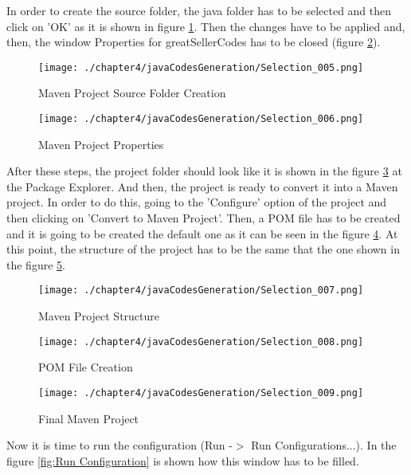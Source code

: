 In order to create the source folder, the java folder has to be selected and then click on 'OK' as it is shown in figure \ref{fig:Maven Project Source Folder Creation}. Then the changes have to be applied and, then, the window Properties for greatSellerCodes has to be closed (figure \ref{fig:Maven Project Properties}).

\begin{figure}
\centering
{\texttt{[image: ./chapter4/javaCodesGeneration/Selection\_005.png]}}
\caption{Maven Project Source Folder Creation}
\label{fig:Maven Project Source Folder Creation}
\end{figure}

\begin{figure}
\centering
{\texttt{[image: ./chapter4/javaCodesGeneration/Selection\_006.png]}}
\caption{Maven Project Properties}
\label{fig:Maven Project Properties}
\end{figure}

After these steps, the project folder should look like it is shown in the figure \ref{fig:Maven Project Structure} at the Package Explorer. And then, the project is ready to convert it into a Maven project. In order to do this, going to the 'Configure' option of the project and then clicking on 'Convert to Maven Project'. Then, a POM file has to be created and it is going to be created the default one as it can be seen in the figure \ref{fig:POM File Creation}. At this point, the structure of the project has to be the same that the one shown in the figure \ref{fig:Final Maven Project}.

\begin{figure}
\centering
{\texttt{[image: ./chapter4/javaCodesGeneration/Selection\_007.png]}}
\caption{Maven Project Structure}
\label{fig:Maven Project Structure}
\end{figure}

\begin{figure}
\centering
{\texttt{[image: ./chapter4/javaCodesGeneration/Selection\_008.png]}}
\caption{POM File Creation}
\label{fig:POM File Creation}
\end{figure}

\begin{figure}
\centering
{\texttt{[image: ./chapter4/javaCodesGeneration/Selection\_009.png]}}
\caption{Final Maven Project}
\label{fig:Final Maven Project}
\end{figure}

Now it is time to run the configuration (Run -$>$ Run Configurations...). In the figure \ref{fig:Run Configuration} is shown how this window has to be filled.

